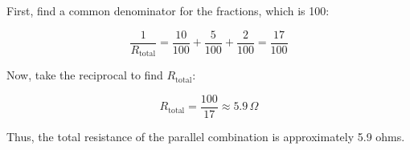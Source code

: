 First, find a common denominator for the fractions, which is 100:

\[
\frac{1}{R_{\text{total}}} = \frac{10}{100} + \frac{5}{100} + \frac{2}{100} = \frac{17}{100}
\]

Now, take the reciprocal to find \( R_{\text{total}} \):

\[
R_{\text{total}} = \frac{100}{17} \approx 5.9 \, \Omega
\]

Thus, the total resistance of the parallel combination is approximately 5.9 ohms.

